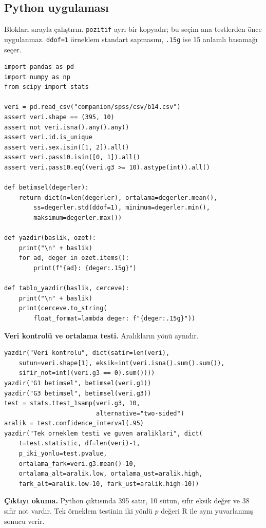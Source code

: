 \par\noindent\begin{minipage}{\linewidth}
\subsection{Python uygulaması}
\label{sec:python-b14}

Blokları sırayla çalıştırın. \texttt{pozitif} ayrı bir kopyadır;
bu seçim ana testlerden önce uygulanmaz. \texttt{ddof=1} örneklem
standart sapmasını, \texttt{.15g} ise 15 anlamlı basamağı seçer.

\begin{lstlisting}[style=prismPythonApp]
import pandas as pd
import numpy as np
from scipy import stats

veri = pd.read_csv("companion/spss/csv/b14.csv")
assert veri.shape == (395, 10)
assert not veri.isna().any().any()
assert veri.id.is_unique
assert veri.sex.isin([1, 2]).all()
assert veri.pass10.isin([0, 1]).all()
assert veri.pass10.eq((veri.g3 >= 10).astype(int)).all()

def betimsel(degerler):
    return dict(n=len(degerler), ortalama=degerler.mean(),
        ss=degerler.std(ddof=1), minimum=degerler.min(),
        maksimum=degerler.max())

def yazdir(baslik, ozet):
    print("\n" + baslik)
    for ad, deger in ozet.items():
        print(f"{ad}: {deger:.15g}")

def tablo_yazdir(baslik, cerceve):
    print("\n" + baslik)
    print(cerceve.to_string(
        float_format=lambda deger: f"{deger:.15g}"))
\end{lstlisting}
\end{minipage}\par

\par\noindent\begin{minipage}{\linewidth}
\textbf{Veri kontrolü ve ortalama testi.} Aralıkların yönü aynıdır.

\begin{lstlisting}[style=prismPythonApp]
yazdir("Veri kontrolu", dict(satir=len(veri),
    sutun=veri.shape[1], eksik=int(veri.isna().sum().sum()),
    sifir_not=int((veri.g3 == 0).sum())))
yazdir("G1 betimsel", betimsel(veri.g1))
yazdir("G3 betimsel", betimsel(veri.g3))
test = stats.ttest_1samp(veri.g3, 10,
                         alternative="two-sided")
aralik = test.confidence_interval(.95)
yazdir("Tek orneklem testi ve guven araliklari", dict(
    t=test.statistic, df=len(veri)-1,
    p_iki_yonlu=test.pvalue,
    ortalama_fark=veri.g3.mean()-10,
    ortalama_alt=aralik.low, ortalama_ust=aralik.high,
    fark_alt=aralik.low-10, fark_ust=aralik.high-10))
\end{lstlisting}

\textbf{Çıktıyı okuma.} Python çıktısında 395 satır, 10 sütun,
sıfır eksik değer ve 38 sıfır not vardır. Tek örneklem testinin
iki yönlü $p$ değeri R ile aynı yuvarlanmış sonucu verir.
\end{minipage}\par

